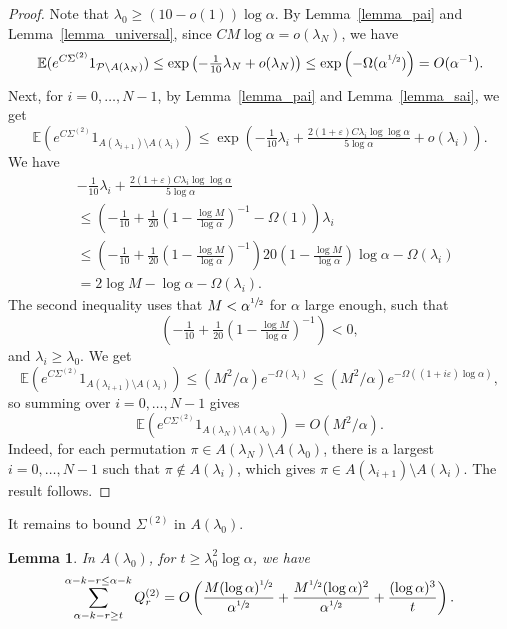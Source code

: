 \documentclass{article}
\theoremstyle{plain}
\theoremstyle{remark}
\theoremstyle{plain}
\newtheorem{lemma}[theorem]{Lemma}
\numberwithin{equation}{section}
\begin{document}
	\begin{proof}
		Note that $\lambda_0\geq(10-o(1))\log\alpha$. By Lemma~\ref{lemma_pai} and Lemma~\ref{lemma_universal}, since $CM\log\alpha=o(\lambda_N)$, we have $$\mathbb{E}(e^{C\Sigma^{(2)}}1_{\mathcal{P}\setminus A(\lambda_N)})\leq\exp\left(-\tfrac1{10}\lambda_N+o(\lambda_N)\right)\leq\exp\left(-\Omega(\alpha^{\sfrac12})\right)=O(\alpha^{-1}).$$ Next, for $i=0,\ldots,N-1$, by Lemma~\ref{lemma_pai} and Lemma~\ref{lemma_sai}, we get $$\mathbb{E}(e^{C\Sigma^{(2)}}1_{A(\lambda_{i+1})\setminus A(\lambda_i)})\leq\exp\left(-\tfrac1{10}\lambda_i+\tfrac{2(1+\varepsilon)C\lambda_i\log\log\alpha}{5\log\alpha}+o(\lambda_i)\right).$$ We have
		\begin{align}
			&-\tfrac1{10}\lambda_i+\tfrac{2(1+\varepsilon)C\lambda_i\log\log\alpha}{5\log\alpha}
			\\&\leq\left(-\tfrac1{10}+\tfrac1{20}\left(1-\tfrac{\log M}{\log\alpha}\right)^{-1}-\Omega(1)\right)\lambda_i
			\\&\leq\left(-\tfrac1{10}+\tfrac1{20}\left(1-\tfrac{\log M}{\log\alpha}\right)^{-1}\right)20\left(1-\tfrac{\log M}{\log\alpha}\right)\log\alpha-\Omega(\lambda_i)
			\\&=2\log M-\log\alpha-\Omega(\lambda_i).
		\end{align}
		The second inequality uses that $M<\alpha^{\sfrac12}$ for $\alpha$ large enough, such that $$\left(-\tfrac1{10}+\tfrac1{20}\left(1-\tfrac{\log M}{\log\alpha}\right)^{-1}\right)<0,$$ and $\lambda_i\geq\lambda_0$. We get $$\mathbb{E}(e^{C\Sigma^{(2)}}1_{A(\lambda_{i+1})\setminus A(\lambda_i)})\leq(M^2/\alpha)e^{-\Omega(\lambda_i)}\leq(M^2/\alpha)e^{-\Omega((1+i\varepsilon)\log\alpha)},$$ so summing over $i=0,\ldots,N-1$ gives $$\mathbb{E}(e^{C\Sigma^{(2)}}1_{A(\lambda_N)\setminus A(\lambda_0)})=O(M^2/\alpha).$$ Indeed, for each permutation $\pi\in A(\lambda_N)\setminus A(\lambda_0)$, there is a largest $i=0,\ldots,N-1$ such that $\pi\not\in A(\lambda_i)$, which gives $\pi\in A(\lambda_{i+1})\setminus A(\lambda_i)$. The result follows.
	\end{proof}
	
	It remains to bound $\Sigma^{(2)}$ in $A(\lambda_0)$.
	
	\begin{lemma}\label{lemma_suma0}
		In $A(\lambda_0)$, for $t\geq\lambda_0^2\log\alpha$, we have $$\sum_{\alpha-k-r\geq t}^{\alpha-k-r\leq\alpha-k}Q_r^{(2)}=O\left(\frac{M(\log\alpha)^{\sfrac12}}{\alpha^{\sfrac12}}+\frac{M^{\sfrac12}(\log\alpha)^2}{\alpha^{\sfrac12}}+\frac{(\log\alpha)^3}{t}\right).$$
	\end{lemma}
	
\end{document}
